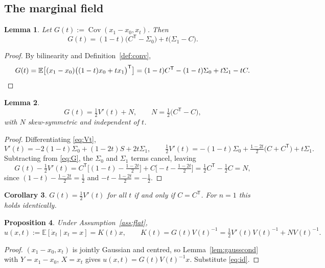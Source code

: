 \documentclass[11pt]{article}
\newtheorem{lemma}{Lemma}[section]
\newtheorem{proposition}[lemma]{Proposition}
\newtheorem{corollary}[lemma]{Corollary}
\theoremstyle{definition}
\theoremstyle{remark}
\DeclareMathOperator{\Cov}{Cov}
\newcommand{\E}{\mathbb{E}}
\newcommand{\T}{\mathsf{T}}
\begin{document}
\subsection{The marginal field}

\begin{lemma}\label{lem:G}
Let $G(t):=\Cov(x_1-x_0,x_t)$. Then
\begin{equation}\label{eq:G}
G(t)=(1-t)\big(C^{\T}-\Sigma_0\big)+t\big(\Sigma_1-C\big).
\end{equation}
\end{lemma}

\begin{proof}
By bilinearity and Definition~\ref{def:conv},
\[
G(t)=\E\big[(x_1-x_0)\big((1-t)x_0+tx_1\big)^{\T}\big]
=(1-t)C^{\T}-(1-t)\Sigma_0+t\Sigma_1-tC. \qedhere
\]
\end{proof}

\begin{lemma}\label{lem:id}
\begin{equation}\label{eq:id}
G(t)=\tfrac12V'(t)+N,\qquad N=\tfrac12\big(C^{\T}-C\big),
\end{equation}
with $N$ skew-symmetric and independent of $t$.
\end{lemma}

\begin{proof}
Differentiating \eqref{eq:Vt},
\[
V'(t)=-2(1-t)\Sigma_0+(1-2t)S+2t\Sigma_1,
\qquad
\tfrac12V'(t)=-(1-t)\Sigma_0+\tfrac{1-2t}{2}\big(C+C^{\T}\big)+t\Sigma_1.
\]
Subtracting from \eqref{eq:G}, the $\Sigma_0$ and $\Sigma_1$ terms cancel, leaving
\[
G(t)-\tfrac12V'(t)
=C^{\T}\Big[(1-t)-\tfrac{1-2t}{2}\Big]+C\Big[-t-\tfrac{1-2t}{2}\Big]
=\tfrac12C^{\T}-\tfrac12C=N,
\]
since $(1-t)-\tfrac{1-2t}{2}=\tfrac12$ and $-t-\tfrac{1-2t}{2}=-\tfrac12$.
\end{proof}

\begin{corollary}\label{cor:idsym}
$G(t)=\tfrac12V'(t)$ for all $t$ if and only if $C=C^{\T}$. For $n=1$ this holds identically.
\end{corollary}

\begin{proposition}\label{prop:linfield}
Under Assumption~\ref{ass:flat},
\begin{equation}\label{eq:K}
u(x,t):=\E[\dot x_t\mid x_t=x]=K(t)x,
\qquad
K(t)=G(t)V(t)^{-1}=\tfrac12V'(t)V(t)^{-1}+NV(t)^{-1}.
\end{equation}
\end{proposition}

\begin{proof}
$(x_1-x_0,x_t)$ is jointly Gaussian and centred, so Lemma~\ref{lem:gausscond} with $Y=x_1-x_0$,
$X=x_t$ gives $u(x,t)=G(t)V(t)^{-1}x$. Substitute \eqref{eq:id}.
\end{proof}
\end{document}
